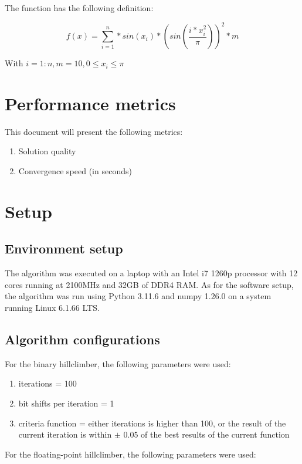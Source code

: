 \documentclass[conference]{IEEEtran}
\begin{document}
The function has the following definition:

\begin{equation}
    f(x) = \sum_{i=1}^{n} * sin(x_i) * (sin(\frac{i * x_i^2}{\pi}))^2*m
\end{equation}

With $i = 1:n, m = 10, 0 \leq x_i \leq \pi$

\section{Performance metrics}
This document will present the following metrics:

\begin{enumerate}
    \item Solution quality
    \item Convergence speed (in seconds)
\end{enumerate}

\section{Setup}

\subsection{Environment setup}
The algorithm was executed on a laptop with an Intel i7 1260p processor with 12 cores running at 2100MHz and 32GB of DDR4 RAM.
As for the software setup, the algorithm was run using Python 3.11.6 and numpy 1.26.0 on a system running Linux 6.1.66 LTS.

\subsection{Algorithm configurations}
For the binary hillclimber, the following parameters were used:

\begin{enumerate}
    \item iterations = 100
    \item bit shifts per iteration = 1
    \item criteria function = either iterations is higher than 100, or the result of the current iteration is within
    $\pm$ 0.05 of the best results of the current function
\end{enumerate}

For the floating-point hillclimber, the following parameters were used:
\end{document}
